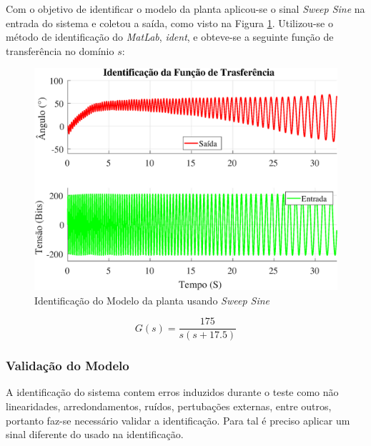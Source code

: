 \documentclass[conference,harvard,brazil,english]{sbatex}
\begin{document}
                Com o objetivo de identificar o modelo da planta aplicou-se o sinal \textit{Sweep Sine} na entrada do sistema e coletou a saída, como visto na Figura \ref{ident}. Utilizou-se o método de identificação do \textit{MatLab}, \textit{ident}, e obteve-se a seguinte função de transferência no domínio $s$:
                
                \begin{figure}[!htb] 
                \centering \includegraphics[width=\columnwidth]{imagens/ident.eps}{
                    \small
                    \centering
                    \caption{Identificação do Modelo da planta usando \textit{Sweep Sine}}
                    \label{ident}}
                \end{figure}
                
                \begin{equation}
                    G(s) = \frac{175}{s(s+17.5)}
                \end{equation}
                
                
                 
            \subsubsection{Validação do Modelo}
            
                A identificação do sistema contem erros induzidos durante o teste como não linearidades, arredondamentos, ruídos, pertubações externas, entre outros, portanto faz-se necessário validar a identificação. Para tal é preciso aplicar um sinal diferente do usado na identificação. 
                
\end{document}
